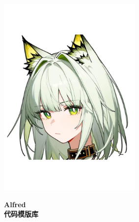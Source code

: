 \documentclass{article}
\begin{document}
\thispagestyle{empty}
\null\vfill
\begin{center}
  \includegraphics[height=10cm]{alfred-avatar.pdf}

  \vspace{1cm}

  \Huge \textbf{Alfred\\代码模版库}
\end{center}
\vfill
\clearpage

\begin{multicols}{2}
\tableofcontents
\end{multicols}

\newpage

\columnseprule=0.25pt




\end{document}

